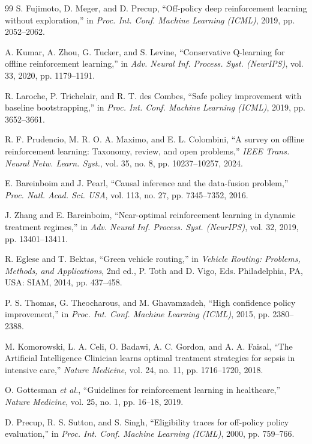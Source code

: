 \documentclass[a4paper,conference]{IEEEtran}
\begin{document}
\begin{thebibliography}{99}
 S. Fujimoto, D. Meger, and D. Precup, ``Off-policy deep reinforcement learning without exploration,'' in \emph{Proc. Int. Conf. Machine Learning (ICML)}, 2019, pp. 2052--2062.

 A. Kumar, A. Zhou, G. Tucker, and S. Levine, ``Conservative Q-learning for offline reinforcement learning,'' in \emph{Adv. Neural Inf. Process. Syst. (NeurIPS)}, vol. 33, 2020, pp. 1179--1191.

 R. Laroche, P. Trichelair, and R. T. des Combes, ``Safe policy improvement with baseline bootstrapping,'' in \emph{Proc. Int. Conf. Machine Learning (ICML)}, 2019, pp. 3652--3661.

 R. F. Prudencio, M. R. O. A. Maximo, and E. L. Colombini, ``A survey on offline reinforcement learning: Taxonomy, review, and open problems,'' \emph{IEEE Trans. Neural Netw. Learn. Syst.}, vol. 35, no. 8, pp. 10237--10257, 2024.

 E. Bareinboim and J. Pearl, ``Causal inference and the data-fusion problem,'' \emph{Proc. Natl. Acad. Sci. USA}, vol. 113, no. 27, pp. 7345--7352, 2016.

 J. Zhang and E. Bareinboim, ``Near-optimal reinforcement learning in dynamic treatment regimes,'' in \emph{Adv. Neural Inf. Process. Syst. (NeurIPS)}, vol. 32, 2019, pp. 13401--13411.

 R. Eglese and T. Bektas, ``Green vehicle routing,'' in \emph{Vehicle Routing: Problems, Methods, and Applications}, 2nd ed., P. Toth and D. Vigo, Eds. Philadelphia, PA, USA: SIAM, 2014, pp. 437--458.

 P. S. Thomas, G. Theocharous, and M. Ghavamzadeh, ``High confidence policy improvement,'' in \emph{Proc. Int. Conf. Machine Learning (ICML)}, 2015, pp. 2380--2388.

 M. Komorowski, L. A. Celi, O. Badawi, A. C. Gordon, and A. A. Faisal, ``The Artificial Intelligence Clinician learns optimal treatment strategies for sepsis in intensive care,'' \emph{Nature Medicine}, vol. 24, no. 11, pp. 1716--1720, 2018.

 O. Gottesman \emph{et al.}, ``Guidelines for reinforcement learning in healthcare,'' \emph{Nature Medicine}, vol. 25, no. 1, pp. 16--18, 2019.

 D. Precup, R. S. Sutton, and S. Singh, ``Eligibility traces for off-policy policy evaluation,'' in \emph{Proc. Int. Conf. Machine Learning (ICML)}, 2000, pp. 759--766.


\end{thebibliography}
\end{document}
